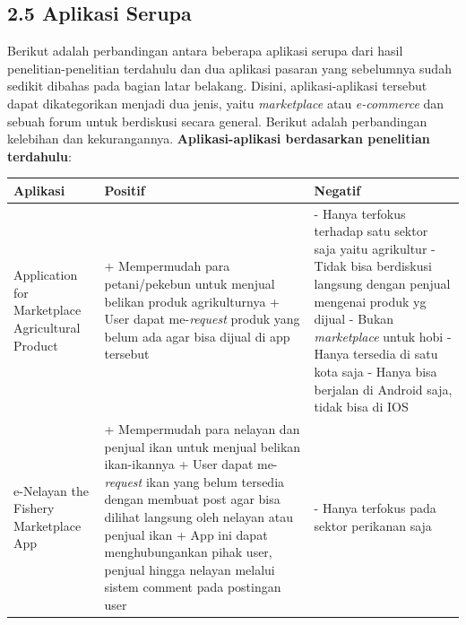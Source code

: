 \documentclass[a4paper]{article}
\begin{document}
\subsection*{2.5 Aplikasi Serupa}
Berikut adalah perbandingan antara beberapa aplikasi serupa dari hasil penelitian-penelitian terdahulu dan dua aplikasi pasaran yang sebelumnya sudah sedikit dibahas pada bagian latar belakang. Disini, aplikasi-aplikasi tersebut dapat dikategorikan menjadi dua jenis, yaitu \textit{marketplace} atau \textit{e-commerce} dan sebuah forum untuk berdiskusi secara general. Berikut adalah perbandingan kelebihan dan kekurangannya.
\textbf{Aplikasi-aplikasi berdasarkan penelitian terdahulu}:
\begin{longtable}{|p{3cm}|p{5cm}|p{5cm}|}
    \hline
    Aplikasi & Positif                                                                                                                 & Negatif \\
    \hline
    Application for Marketplace Agricultural Product
             & + Mempermudah para petani/pekebun untuk menjual belikan produk agrikulturnya \newline
    + User dapat me-\textit{request} produk yang belum ada agar bisa dijual di app tersebut \newline
             & - Hanya terfokus terhadap satu sektor saja yaitu agrikultur \newline
    - Tidak bisa berdiskusi langsung dengan penjual mengenai produk yg dijual \newline
    - Bukan \textit{marketplace} untuk hobi \newline
    - Hanya tersedia di satu kota saja \newline
    - Hanya bisa berjalan di Android saja, tidak bisa di IOS                                                                                     \\
    \hline
    e-Nelayan the Fishery Marketplace App
             & + Mempermudah para nelayan dan penjual ikan untuk menjual belikan ikan-ikannya \newline
    + User dapat me-\textit{request} ikan yang belum tersedia dengan membuat post agar bisa dilihat langsung oleh nelayan atau penjual ikan \newline
    + App ini dapat menghubungankan pihak user, penjual hingga nelayan melalui sistem comment pada postingan user \newline
             & - Hanya terfokus pada sektor perikanan saja \newline

\end{longtable}
\end{document}
